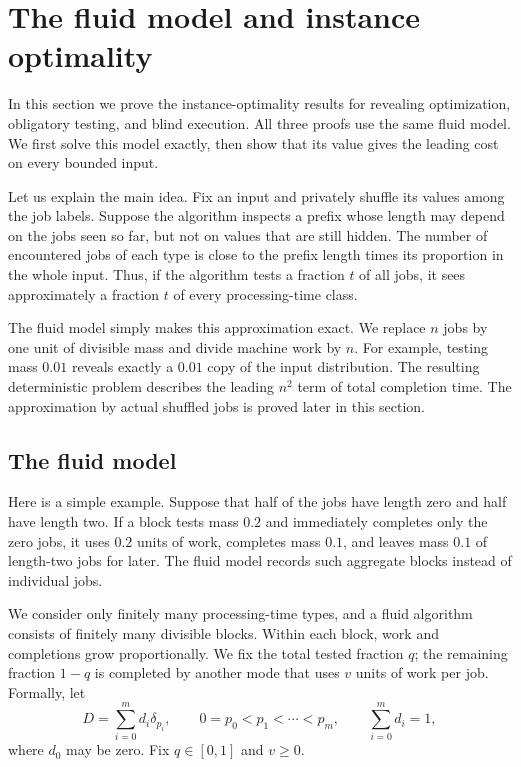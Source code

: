 \section{The fluid model and instance optimality}
\label{sec:common-fluid-envelopes}

In this section we prove the instance-optimality results for revealing
optimization, obligatory testing, and blind execution.  All three proofs use
the same fluid model.  We first solve this model exactly, then show that its
value gives the leading cost on every bounded input.

Let us explain the main idea.  Fix an input and privately shuffle its
values among the job labels.  Suppose the algorithm inspects a prefix whose
length may depend on the jobs seen so far, but not on values that are still
hidden.  The number of encountered jobs of each type is close to the prefix
length times its proportion in the whole input.  Thus, if the algorithm tests
a fraction $t$ of all jobs, it sees approximately a fraction $t$ of every
processing-time class.

The fluid model simply makes this approximation exact.  We replace $n$ jobs
by one unit of divisible mass and divide machine work by $n$.  For example,
testing mass $0.01$ reveals exactly a $0.01$ copy of the input distribution.
The resulting deterministic problem describes the leading $n^2$ term of
total completion time.  The approximation by actual shuffled jobs is proved
later in this section.

\subsection{The fluid model}

Here is a simple example.  Suppose that half of the jobs have length zero and
half have length two.  If a block tests mass $0.2$ and immediately completes
only the zero jobs, it uses $0.2$ units of work, completes mass $0.1$, and
leaves mass $0.1$ of length-two jobs for later.  The fluid model records such
aggregate blocks instead of individual jobs.

We consider only finitely many processing-time types, and a fluid algorithm
consists of finitely many divisible blocks.  Within each block, work and
completions grow proportionally.  We fix the total tested fraction $q$;
the remaining fraction $1-q$ is completed by another mode that uses $v$
units of work per job.  Formally, let
\begin{equation}
 D=\sum_{i=0}^m d_i\delta_{p_i},
 \qquad 0=p_0<p_1<\cdots<p_m,
 \qquad \sum_{i=0}^m d_i=1,
 \label{eq:fluid-finite-distribution}
\end{equation}
where $d_0$ may be zero.  Fix $q\in[0,1]$ and $v\ge0$.

